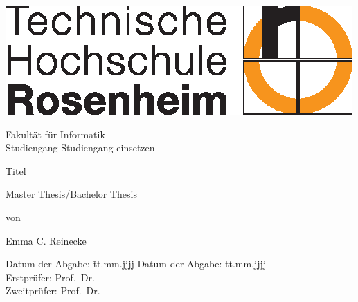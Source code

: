 \begin{titlepage}

\sffamily

\raggedleft

\vspace*{-2cm}

\includegraphics{logo-th-rosenheim-2019_master_quer_2c.eps}

\vfill

\centering
\LARGE
Fakultät für Informatik  \vspace{0.5cm}\\
\Large
Studiengang Studiengang-einsetzen

\vspace{2cm}

\LARGE

Titel

\vspace{2cm}

\Large
Master Thesis/Bachelor Thesis

\vspace{1.5cm}


\Large
von

\vspace{0.5cm}


\LARGE
Emma C. Reinecke \vspace{1cm}

\vspace{1cm}

\flushleft
 \Large
\vspace*{\fill}

\begin{tabbing}
Datum der Abgabe: \= tt.mm.jjjj \kill
Datum der Abgabe: \> tt.mm.jjjj \\
Erstprüfer: \> Prof.\ Dr.\ \\
Zweitprüfer: \> Prof.\ Dr.\
\end{tabbing}

\end{titlepage}

